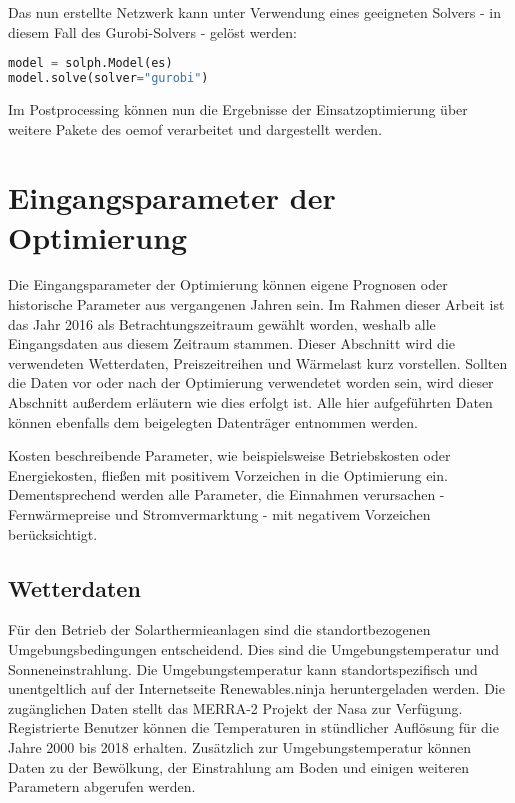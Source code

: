 Das nun erstellte Netzwerk kann unter Verwendung eines geeigneten Solvers - in diesem Fall des Gurobi-Solvers - gelöst werden:
\begin{lstlisting}[language=python,numbers=none]
model = solph.Model(es)
model.solve(solver="gurobi")
\end{lstlisting}
Im Postprocessing können nun die Ergebnisse der Einsatzoptimierung über weitere Pakete des \acl{oemof} verarbeitet und dargestellt werden.

\section{Eingangsparameter der Optimierung}\label{section: Eingangsparameter der Optimierung}
Die Eingangsparameter der Optimierung können eigene Prognosen oder historische Parameter aus vergangenen Jahren sein. Im Rahmen dieser Arbeit ist das Jahr 2016 als Betrachtungszeitraum gewählt worden, weshalb alle Eingangsdaten aus diesem Zeitraum stammen. Dieser Abschnitt wird die verwendeten Wetterdaten, Preiszeitreihen und Wärmelast kurz vorstellen. Sollten die Daten vor oder nach der Optimierung verwendetet worden sein, wird dieser Abschnitt außerdem erläutern wie dies erfolgt ist. Alle hier aufgeführten Daten können ebenfalls dem beigelegten Datenträger entnommen werden.

Kosten beschreibende Parameter, wie beispielsweise Betriebskosten oder Energiekosten, fließen mit positivem Vorzeichen in die Optimierung ein. Dementsprechend werden alle Parameter, die Einnahmen verursachen - Fernwärmepreise und Stromvermarktung - mit negativem Vorzeichen berücksichtigt.

\subsection*{Wetterdaten}
Für den Betrieb der Solarthermieanlagen sind die standortbezogenen Umgebungsbedingungen entscheidend. Dies sind die Umgebungstemperatur und Sonneneinstrahlung. Die Umgebungstemperatur kann standortspezifisch und unentgeltlich auf der Internetseite Renewables.ninja \cite{pfenninger2016renewables} heruntergeladen werden. Die zugänglichen Daten stellt das MERRA-2 Projekt der Nasa \cite{Gelaro2017a} zur Verfügung. Registrierte Benutzer können die Temperaturen in stündlicher Auflösung für die Jahre 2000 bis 2018 erhalten. Zusätzlich zur Umgebungstemperatur können Daten zu der Bewölkung, der Einstrahlung am Boden und einigen weiteren Parametern abgerufen werden. 

